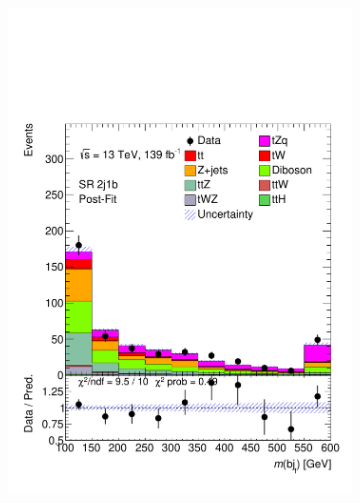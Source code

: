 \begin{figure}[!h]
\begin{subfigure}[b]{0.33\linewidth}
    \includegraphics[width=\textwidth]{ubonn-thesis/Chapters/Chapters_08/appendix/data/SR_2j1b_postFit.pdf} 
  \end{subfigure} 
  \begin{subfigure}[b]{0.33\linewidth}
    \centering

\end{subfigure}
\end{figure}
